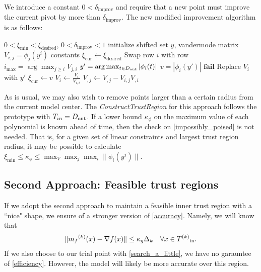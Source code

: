 We introduce a constant $0<\delta_{\text{improv}}$ and require that a new point must improve the current pivot by more than $\delta_{\text{improv}}$.
The new modified improvement algorithm is as follows:

\begin{algorithmic}[1]
\State $0 < \xi_{\text{min}} < \xi_{\text{desired}}$, $0 <\delta_{\text{improv}} < 1$
\State initialize shifted set $y$, vandermode matrix $V_{i,j} = \phi_j(y^i)$ constants
\State $\xi_{\text{cur}} \gets \xi_{\text{desired}}$
    \State Swap row $i$ with row $i_{\max} = \arg \max_{j\ge i} V_{j,i} $
        \State $y' = \arg\max_{t \in D_{\text{out}}} |\phi_i(t)|$
        \State $v = |\phi_i(y')|$
            \State $\mathbf {fail}$
        \EndIf
            \State Replace $V_i$ with $y'$
            \State $\xi_{\text{cur}} \gets v$
        \EndIf
    \EndIf
    \State $V_i \gets \frac{V_i}{V_{i,i}} $
        \State $V_{,j} \gets V_{, j} - V_{i,j} V_{, i}$
    \EndFor
\EndFor
\end{algorithmic}

As is usual, we may also wish to remove points larger than a certain radius from the current model center.
The \emph{ConstructTrustRegion} for this approach follows the prototype with $T_{in} = D_{\text{out}}$.
If a lower bound $\kappa_{\phi}$ on the maximum value of each polynomial is known ahead of time, then the check on \ref{impossibly_poised} is not needed.
That is, for a given set of linear constraints and largest trust region radius, it may be possible to calculate $\xi_{\text{min}} \le \kappa_{\phi} \le \max_{V}\max_{j}\max_{i}\|\phi_i(y^j)\|$.






\subsection{Second Approach: Feasible trust regions}

If we adopt the second approach to maintain a feasible inner trust region with a ``nice" shape, we ensure of a stronger version of \ref{accuracy}.
Namely, we will know that 
\[
    \|{{m}_f}^{(k)}(x) - \nabla f(x) \| \le \kappa_g \Delta_{k} \quad \forall x \in {T^{(k)}}_{\text{in}}.
\]
If we also choose to our trial point with \ref{search_a_little}, we have no garauntee of \ref{efficiency}.
However, the model will likely be more accurate over this region.

